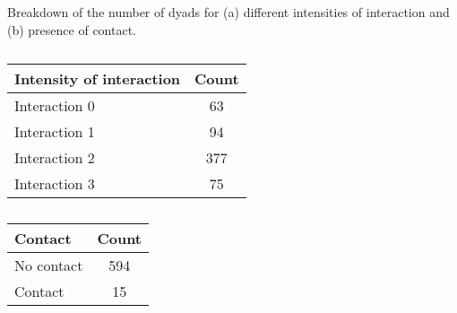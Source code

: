 \begin{table}
\centering
\caption{Breakdown of the number of dyads for (a) different intensities of interaction and (b) presence of contact.}
\label{tab:counts_dyads}
\begin{subtable}{.45\linewidth}
\centering
\caption{}
\begin{tabular}{lc}
\toprule
Intensity of interaction & Count \\
\midrule
Interaction 0 & 63 \\
Interaction 1 & 94 \\
Interaction 2 & 377 \\
Interaction 3 & 75 \\
\bottomrule
\end{tabular}
\end{subtable}
\begin{subtable}{.45\linewidth}
\centering
\caption{}
\begin{tabular}{lc}
\toprule
Contact & Count \\
\midrule
No contact & 594 \\
Contact & 15 \\
\bottomrule
\end{tabular}
\end{subtable}
\end{table}
